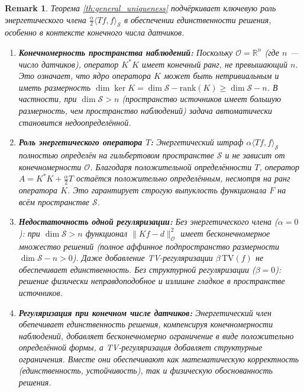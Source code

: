 \documentclass[sn-mathphys-num]{bst/sn-jnl}
\theoremstyle{thmstylethree}
\theoremstyle{thmstyletwo}
\newtheorem{remark}{Remark}
\theoremstyle{thmstyleone}
\begin{document}
\begin{remark}
Теорема \ref{th:general_uniqueness} подчёркивает ключевую роль энергетического члена $\frac{\alpha}{2}\langle Tf, 
f\rangle_{\mathcal{S}}$ в обеспечении единственности решения, особенно в контексте конечного числа датчиков.

\begin{enumerate}
    \item \textbf{Конечномерность пространства наблюдений:}
    Поскольку $\mathcal{O} = \mathbb{R}^n$ (где $n$ — число датчиков),
    оператор $K^*K$ имеет конечный ранг, не превышающий $n$. Это означает, что ядро оператора $K$ может быть нетривиальным и иметь размерность $\dim \ker K = \dim \mathcal{S} - \mathrm{rank}(K) \geq \dim \mathcal{S} - n$. В частности, при $\dim \mathcal{S} > n$ (пространство источников имеет большую размерность, чем пространство наблюдений) задача автоматически становится недоопределённой.
    
    \item \textbf{Роль энергетического оператора $T$:}
    Энергетический штраф $\alpha \langle Tf, f\rangle_{\mathcal{S}}$ 
    полностью определён на гильбертовом пространстве $\mathcal{S}$ и не зависит от конечномерности $\mathcal{O}$. Благодаря положительной определённости $T$, 
    оператор $A = K^*K + \frac{\alpha}{2}T$ остаётся положительно определённым, несмотря на ранг оператора $K$. 
    Это гарантирует строгую выпуклость функционала $F$ на всём пространстве $\mathcal{S}$.
    
    \item \textbf{Недостаточность одной регуляризации:} 
    Без энергетического члена ($\alpha=0$): при $\dim \mathcal{S} > n$ функционал $\|Kf-d\|_{\mathcal{O}}^2$ имеет 
    бесконечномерное множество решений (полное аффинное подпространство размерности $\dim \mathcal{S} - n > 0$). 
    Даже добавление TV-регуляризации $\beta\,\mathrm{TV}(f)$ не обеспечивает единственность.
    Без структурной регуляризации ($\beta=0$): решение физически неправдоподобное и
    излишне гладкое в пространстве источников.

    
    \item \textbf{Регуляризация при конечном числе датчиков:} Энергетический член обепечивает единственность решения, компенсируя
    конечномерности наблюдений, добавляет бесконечномерно ограничение в виде положительно определённой формы, 
    а TV-регуляризация добавляет структурные ограничения. Вместе они обеспечивают как математическую корректность (единственность, устойчивость), 
    так и физическую обоснованность решения.
    
\end{enumerate}
\end{remark}
\end{document}
